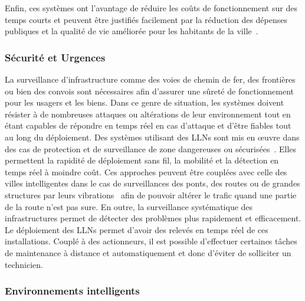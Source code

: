 Enfin, ces systèmes ont l'avantage de réduire les coûts de fonctionnement sur des temps courts et peuvent être justifiés facilement par la réduction des dépenses publiques et la qualité de vie améliorée pour les habitants de la ville~\cite{song2014high, lee2013integrated}.

\subsubsection{Sécurité et Urgences}

La surveillance d'infrastructure comme des voies de chemin de fer, des frontières ou bien des convois sont nécessaires afin d'assurer une sûreté de fonctionnement pour les usagers et les biens.
Dans ce genre de situation, les systèmes doivent résister à de nombreuses attaques ou altérations de leur environnement tout en étant capables de répondre en temps réel en cas d'attaque et d'être fiables tout au long du déploiement.
Des systèmes utilisant des \ac{LLN}s sont mis en œuvre dans des cas de protection et de surveillance de zone dangereuses ou sécurisées~\cite{cao2005analysis}.
Elles permettent la rapidité de déploiement sans fil, la mobilité et la détection en temps réel à moindre coût.
Ces approches peuvent être couplées avec celle des villes intelligentes dans le cas de surveillances des ponts, des routes ou de grandes structures par leurs vibrations~\cite{kim2007health} afin de pouvoir altérer le trafic quand une partie de la route n'est pas sure.
En outre, la surveillance systématique des infrastructures permet de détecter des problèmes plus rapidement et efficacement.
Le déploiement des \ac{LLN}s permet d'avoir des relevés en temps réel de ces installations.
Couplé à des actionneurs, il est possible d'effectuer certaines tâches de maintenance à distance et automatiquement et donc d'éviter de solliciter un technicien.

\subsubsection{Environnements intelligents}

